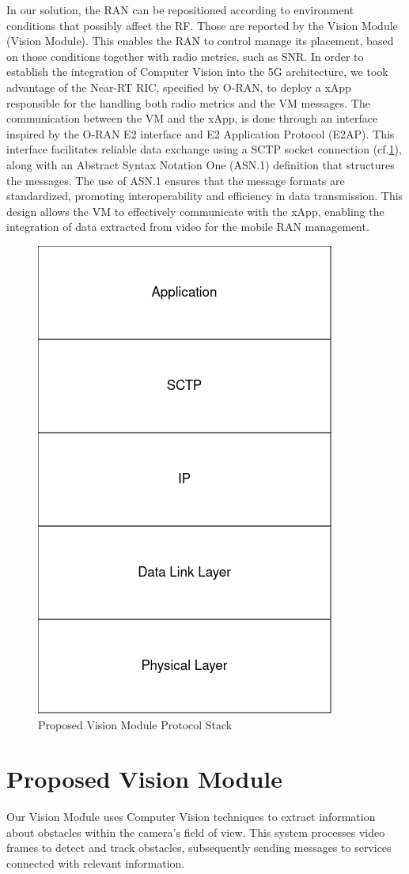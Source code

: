 In our solution, the RAN can be repositioned according to environment conditions that possibly affect the RF\@.
Those are reported by the Vision Module (Vision Module).
This enables the RAN to control manage its placement, based on those conditions together with radio metrics, such as SNR\@.
In order to establish the integration of Computer Vision into the 5G architecture, we took advantage of the Near-RT RIC, specified by O-RAN, to deploy a xApp responsible for the handling both radio metrics and the VM messages.
The communication between the VM and the xApp, is done through an interface inspired by the O-RAN E2 interface and E2 Application Protocol (E2AP).
This interface facilitates reliable data exchange using a SCTP socket connection (cf.\ref{fig:stack}), along with an Abstract Syntax Notation One (ASN.1) definition that structures the messages.
The use of ASN.1 ensures that the message formats are standardized, promoting interoperability and efficiency in data transmission.
This design allows the VM to effectively communicate with the xApp, enabling the integration of data extracted from video for the mobile RAN management.

\begin{figure}[H]
    \centering
    \includegraphics[width=0.35\linewidth]{figures/VisionModule_ProtocolStack.drawio(2)}
    \caption[Proposed Vision Module Protocol Stack]{Proposed Vision Module Protocol Stack}
    \label{fig:stack}
\end{figure}


\section{Proposed Vision Module}\label{sec:prop_vision}
Our Vision Module uses Computer Vision techniques to extract information about obstacles within the camera's field of view.
This system processes video frames to detect and track obstacles, subsequently sending messages to services connected with relevant information.

